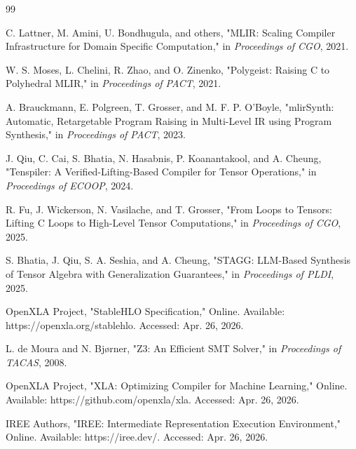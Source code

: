 \begin{thebibliography}{99}

C. Lattner, M. Amini, U. Bondhugula, and others,
"MLIR: Scaling Compiler Infrastructure for Domain Specific Computation," in \textit{Proceedings of CGO}, 2021.

W. S. Moses, L. Chelini, R. Zhao, and O. Zinenko,
"Polygeist: Raising C to Polyhedral MLIR," in \textit{Proceedings of PACT}, 2021.

A. Brauckmann, E. Polgreen, T. Grosser, and M. F. P. O'Boyle,
"mlirSynth: Automatic, Retargetable Program Raising in Multi-Level IR using Program Synthesis," in \textit{Proceedings of PACT}, 2023.

J. Qiu, C. Cai, S. Bhatia, N. Hasabnis, P. Koanantakool, and A. Cheung,
"Tenspiler: A Verified-Lifting-Based Compiler for Tensor Operations," in \textit{Proceedings of ECOOP}, 2024.

R. Fu, J. Wickerson, N. Vasilache, and T. Grosser,
"From Loops to Tensors: Lifting C Loops to High-Level Tensor Computations," in \textit{Proceedings of CGO}, 2025.

S. Bhatia, J. Qiu, S. A. Seshia, and A. Cheung,
"STAGG: LLM-Based Synthesis of Tensor Algebra with Generalization Guarantees," in \textit{Proceedings of PLDI}, 2025.

OpenXLA Project,
"StableHLO Specification," Online. Available: https://openxla.org/stablehlo. Accessed: Apr. 26, 2026.

L. de Moura and N. Bj\o{}rner,
"Z3: An Efficient SMT Solver," in \textit{Proceedings of TACAS}, 2008.

OpenXLA Project,
"XLA: Optimizing Compiler for Machine Learning," Online. Available: https://github.com/openxla/xla. Accessed: Apr. 26, 2026.

IREE Authors,
"IREE: Intermediate Representation Execution Environment," Online. Available: https://iree.dev/. Accessed: Apr. 26, 2026.

\end{thebibliography}
